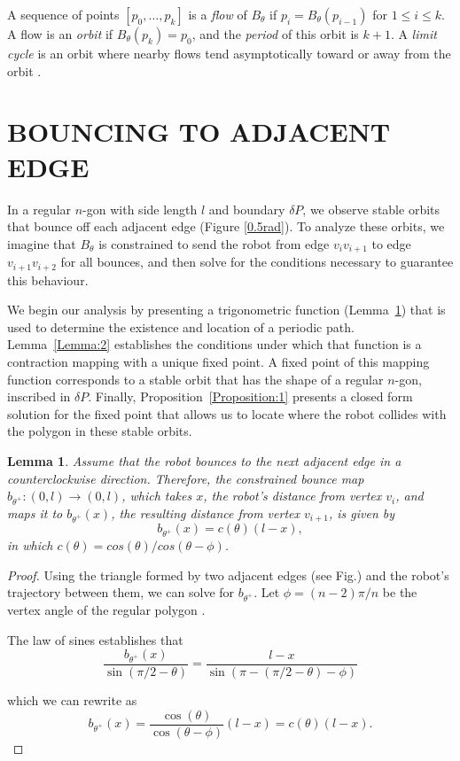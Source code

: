 \documentclass[letterpaper, 10 pt, conference]{ieeeconf}  %
\newtheorem{lemma}{\bf Lemma}
\begin{document}
A sequence of points $[p_0, \ldots, p_k]$ is a \textit{flow} of $B_{\theta}$ if
$p_i = B_{\theta}(p_{i-1})$ for $1 \leq i \leq k$. A flow is an \textit{orbit} if
$B_{\theta}(p_k) = p_0$, and the \textit{period} of this orbit is $k+1$. A \textit{limit
cycle} is an orbit where nearby flows tend asymptotically toward or away from
the orbit \cite{jackson1992}.

\section{BOUNCING TO ADJACENT EDGE\label{adj_edge}}
\label{section:BAE}

In a regular $n$-gon with side length $l$ and boundary $\delta P$, we observe
stable orbits that bounce off each adjacent edge (Figure
\ref{0.5rad}). 
To analyze these orbits, we imagine that $B_{\theta}$ is
constrained to send the robot from edge $v_i v_{i+1}$ to edge $v_{i+1} v_{i+2}$
for all bounces, and then solve for the conditions necessary to guarantee this
behaviour. 

We begin our analysis by presenting a trigonometric function
(Lemma~\ref{Lemma:1}) that is used to determine the existence and location of a
periodic path. Lemma~\ref{Lemma:2} establishes the conditions under which
that function is a contraction mapping with a unique fixed point. A fixed point
of this mapping function corresponds to a stable orbit that has the shape of a
regular $n$-gon, inscribed in $\delta P$. Finally,
Proposition~\ref{Proposition:1} presents a closed form solution for the fixed
point that allows us to locate where the robot collides with the polygon in
these stable orbits.

\begin{lemma} \label{Lemma:1}
Assume that the robot bounces to the next adjacent edge in a
counterclockwise direction. Therefore, the constrained bounce
map $b_{\theta^+} : (0, l) \to (0, l)$, which takes $x$, the
robot's distance from vertex $v_i$, and maps it to $b_{\theta^+}(x)$,
the resulting distance from vertex $v_{i+1}$, is given by
\begin{equation} \label{b-one-bounce}
b_{\theta^+}(x) = c(\theta)(l-x),
\end{equation}
in which $c(\theta) = cos(\theta) / cos(\theta - \phi)$.
\end{lemma}
\begin{proof}
Using the triangle formed by two adjacent edges (see Fig.)
and the robot's trajectory between them, we can solve for
$b_{\theta^+}$. Let $\phi = (n - 2)\pi/n$ be the vertex angle of
the regular polygon \cite{johnson1929}.

The law of sines establishes that
$$ \frac{b_{\theta^+}(x)}{\sin (\pi/2-\theta)} = \frac{l-x}{\sin
(\pi-(\pi/2-\theta)-\phi)} $$

\noindent which we can rewrite as
$$ b_{\theta^+}(x) = \frac{\cos(\theta)}{\cos
(\theta-\phi)}(l-x)  = c(\theta) (l-x). $$

\end{proof}
\end{document}
